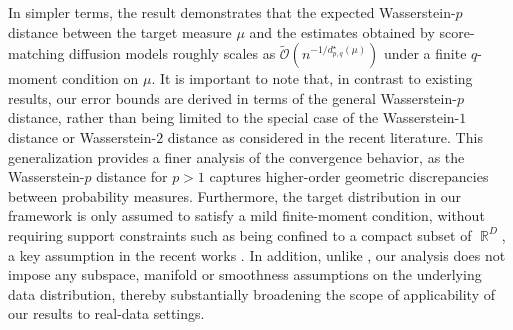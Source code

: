 \documentclass[12pts]{article}
\def\Real{\mathop{\mathbb{R}}\nolimits}
\newcommand{\cO}{ \mathcal{O}}
\begin{document}
In simpler terms, the result demonstrates that the expected Wasserstein-$p$ distance between the target measure $\mu$ and the estimates obtained by score-matching diffusion models roughly scales as $\widetilde{\cO}\left( n^{-1/d^\star_{p,q}(\mu)}\right)$ under a finite $q$-moment condition on $\mu$. It is important to note that, in contrast to existing results, our error bounds are derived in terms of the general Wasserstein-$p$ distance, rather than being limited to the special case of the Wasserstein-$1$ distance \citep{pmlr-v238-tang24a,oko2023diffusion,azangulov2024convergence} or Wasserstein-$2$ distance \citep{gao2025wasserstein,beyler2025convergence} as considered in the recent literature. This generalization provides a finer analysis of the convergence behavior, as the Wasserstein-$p$ distance for $p>1$ captures higher-order geometric discrepancies between probability measures. Furthermore, the target distribution in our framework is only assumed to satisfy a mild finite-moment condition, without requiring support constraints such as being confined to a compact subset of $\Real^D$, a key assumption in the recent works \citep{pmlr-v238-tang24a, oko2023diffusion, azangulov2024convergence}. In addition, unlike \citet{pmlr-v238-tang24a, azangulov2024convergence, chen2023score}, our analysis does not impose any subspace, manifold or smoothness assumptions on the underlying data distribution, thereby substantially broadening the scope of applicability of our results to real-data settings.
\end{document}
